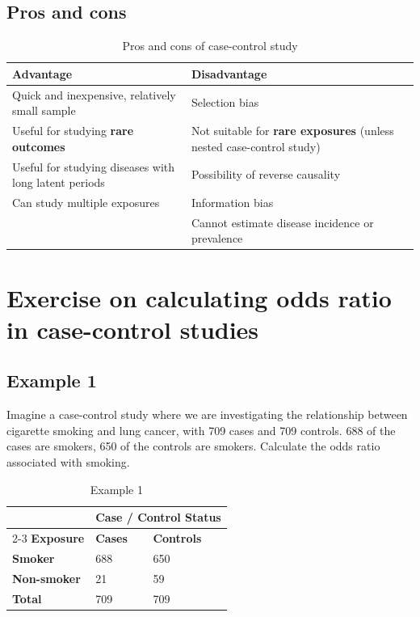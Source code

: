 \documentclass{article}
\begin{document}
\subsection*{Pros and cons}
\begin{table}[H]
\centering
\begin{tabularx}{\textwidth}{|X|X|}
\hline
\textbf{Advantage} & \textbf{Disadvantage} \\ \hline
Quick and inexpensive, relatively small sample & Selection bias \\ \hline
Useful for studying \textbf{rare outcomes} & Not suitable for \textbf{rare exposures} (unless nested case-control study) \\ \hline
Useful for studying diseases with long latent periods & Possibility of reverse causality \\ \hline
Can study multiple exposures & Information bias \\ \hline
& Cannot estimate disease incidence or prevalence \\ \hline
\end{tabularx}
\caption{Pros and cons of case-control study}
\label{tab:pros-cons-case-control-study}
\end{table}

\pagebreak
\section{Exercise on calculating odds ratio in case-control studies}
\subsection{Example 1}
Imagine a case-control study where we are investigating the relationship between cigarette smoking and lung cancer, with 709 cases and 709 controls. 688 of the cases are smokers, 650 of the controls are smokers. Calculate the odds ratio associated with smoking.

\begin{table}[H]
\centering
\begin{tabularx}{\textwidth}{|X|X|X|}
\hline
& \multicolumn{2}{c|}{\textbf{Case / Control Status}}  \\ \cline{2-3}
\textbf{Exposure} & \textbf{Cases} & \textbf{Controls} \\ \hline
\textbf{Smoker} & 688 & 650  \\
\textbf{Non-smoker} & 21 & 59 \\ \hline
\textbf{Total} & 709 & 709 \\ \hline
\end{tabularx}
\caption{Example 1}
\label{tab:example-1}
\end{table}
\end{document}
